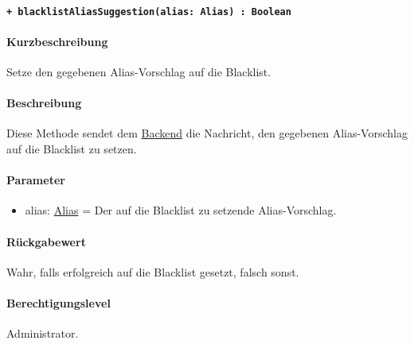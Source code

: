 \paragraph{\texttt{+ blacklistAliasSuggestion(alias: Alias) : Boolean}}\label{AP_Framework_blacklistAliasSuggestion}%
\paragraph*{Kurzbeschreibung}
Setze den gegebenen Alias-Vorschlag auf die Blacklist.
\paragraph*{Beschreibung}
Diese Methode sendet dem \hyperref[AP_Backend]{Backend} die Nachricht, den gegebenen Alias-Vorschlag auf die Blacklist zu setzen.
\paragraph*{Parameter}
\begin{itemize}
    \item alias: \hyperref[AP_Alias]{Alias} = Der auf die Blacklist zu setzende Alias-Vorschlag.
\end{itemize}
\paragraph*{Rückgabewert}
Wahr, falls erfolgreich auf die Blacklist gesetzt, falsch sonst.
\paragraph*{Berechtigungslevel}
Administrator.